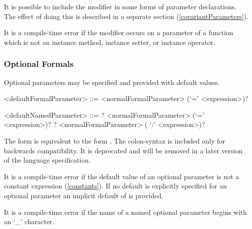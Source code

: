 \documentclass[makeidx]{article}
\begin{document}
\LMHash{}%
It is possible to include the modifier \COVARIANT{}
in some forms of parameter declarations.
The effect of doing this is described in a separate section
(\ref{covariantParameters}).


\LMHash{}%
It is a compile-time error if the modifier \COVARIANT{} occurs on a parameter of a function which is not an instance method, instance setter, or instance operator.


\subsubsection{Optional Formals}

\LMHash{}%
Optional parameters may be specified and provided with default values.

\begin{grammar}
<defaultFormalParameter> ::= <normalFormalParameter> (`=' <expression>)?

<defaultNamedParameter> ::= \REQUIRED{}? <normalFormalParameter> (`=' <expression>)?
  \alt \REQUIRED{}? <normalFormalParameter> ( `:' <expression>)?
\end{grammar}

The form 
is equivalent to the form
.
The colon-syntax is included only for backwards compatibility.
It is deprecated and will be removed in a later version of the language specification.

\LMHash{}%
It is a compile-time error if the default value of an optional parameter is not a constant expression (\ref{constants}).
If no default is explicitly specified for an optional parameter an implicit default of \NULL{} is provided.

\LMHash{}%
It is a compile-time error if the name of a named optional parameter begins with an `_' character.

\end{document}
